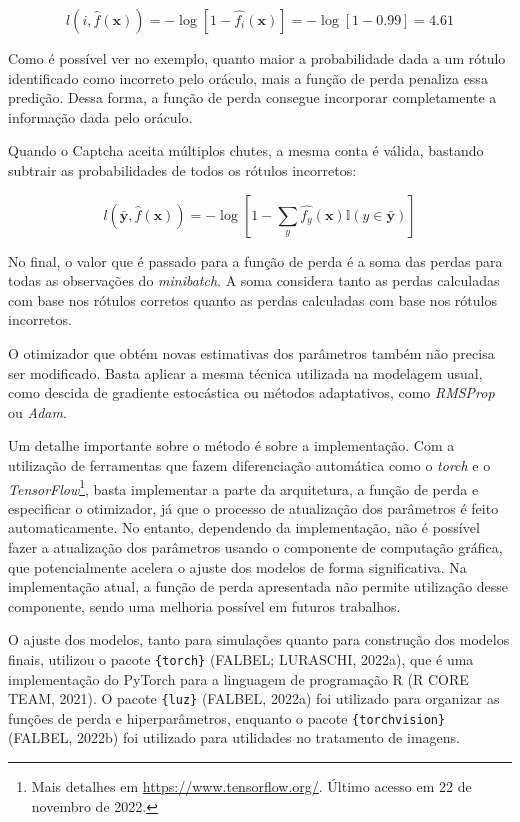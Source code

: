 \documentclass[12pt,twoside,brazilian]{book}
\begin{document}
\[
l(i,\hat f(\mathbf x)) = -\log\left[1-\hat {f_i}(\mathbf x)\right] = -\log\left[1-0.99 \right] = 4.61
\]

Como é possível ver no exemplo, quanto maior a probabilidade dada a um
rótulo identificado como incorreto pelo oráculo, mais a função de perda
penaliza essa predição. Dessa forma, a função de perda consegue
incorporar completamente a informação dada pelo oráculo.

Quando o Captcha aceita múltiplos chutes, a mesma conta é válida,
bastando subtrair as probabilidades de todos os rótulos incorretos:

\[
l(\bar {\mathbf y}, \hat f(\mathbf x)) = -\log\left[1 - \sum_{y}\hat {f_y}(\mathbf x) \mathbb I(y \in \bar {\mathbf y})\right]
\]

No final, o valor que é passado para a função de perda é a soma das
perdas para todas as observações do \emph{minibatch}. A soma considera
tanto as perdas calculadas com base nos rótulos corretos quanto as
perdas calculadas com base nos rótulos incorretos.

O otimizador que obtém novas estimativas dos parâmetros também não
precisa ser modificado. Basta aplicar a mesma técnica utilizada na
modelagem usual, como descida de gradiente estocástica ou métodos
adaptativos, como \emph{RMSProp} ou \emph{Adam}.

Um detalhe importante sobre o método é sobre a implementação. Com a
utilização de ferramentas que fazem diferenciação automática como o
\emph{torch} e o \emph{TensorFlow}\footnote{Mais detalhes em
  \url{https://www.tensorflow.org/}. Último acesso em 22 de novembro de
  2022.}, basta implementar a parte da arquitetura, a função de perda e
especificar o otimizador, já que o processo de atualização dos
parâmetros é feito automaticamente. No entanto, dependendo da
implementação, não é possível fazer a atualização dos parâmetros usando
o componente de computação gráfica, que potencialmente acelera o ajuste
dos modelos de forma significativa. Na implementação atual, a função de
perda apresentada não permite utilização desse componente, sendo uma
melhoria possível em futuros trabalhos.

O ajuste dos modelos, tanto para simulações quanto para construção dos
modelos finais, utilizou o pacote \texttt{\{torch\}} (FALBEL; LURASCHI,
2022a), que é uma implementação do PyTorch para a linguagem de
programação R (R CORE TEAM, 2021). O pacote \texttt{\{luz\}} (FALBEL,
2022a) foi utilizado para organizar as funções de perda e
hiperparâmetros, enquanto o pacote \texttt{\{torchvision\}} (FALBEL,
2022b) foi utilizado para utilidades no tratamento de imagens.
\end{document}

